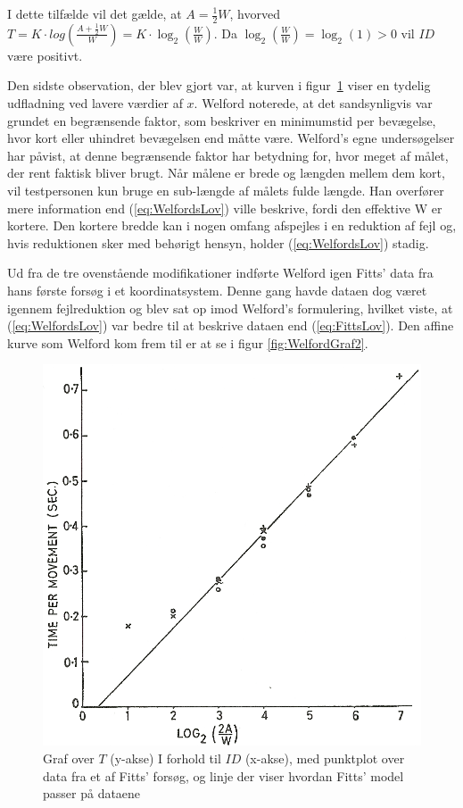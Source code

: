I dette tilfælde vil det gælde, at $A = \frac{1}{2}W$, hvorved $T = K \cdot log\left(\frac{A + \frac{1}{2}W}{W}\right) = K \cdot \log_2\left(\frac{W}{W}\right)$. Da $\log_2\left(\frac{W}{W}\right)=\log_2(1) > 0 $ vil $ID$ være positivt.

Den sidste observation, der blev gjort var, at kurven i figur~\ref{fig:WelfordGraf} viser en tydelig udfladning ved lavere værdier af $x$. Welford noterede, at det sandsynligvis var grundet en begrænsende faktor, som beskriver en minimumstid per bevægelse, hvor kort eller uhindret bevægelsen end måtte være. Welford's egne undersøgelser har påvist, at denne begrænsende faktor har betydning for, hvor meget af målet, der rent faktisk bliver brugt. Når målene er brede og længden mellem dem kort, vil testpersonen kun bruge en sub-længde af målets fulde længde. Han overfører mere information end (\ref{eq:WelfordsLov}) ville beskrive, fordi den effektive W er kortere. Den kortere bredde kan i nogen omfang afspejles i en reduktion af fejl og, hvis reduktionen sker med behørigt hensyn, holder (\ref{eq:WelfordsLov}) stadig.

Ud fra de tre ovenstående modifikationer indførte Welford igen Fitts' data fra hans første forsøg i et koordinatsystem. Denne gang havde dataen dog været igennem fejlreduktion og blev sat op imod Welford's formulering, hvilket viste, at (\ref{eq:WelfordsLov}) var bedre til at beskrive dataen end (\ref{eq:FittsLov}). Den affine kurve som Welford kom frem til er at se i figur \ref{fig:WelfordGraf2}.

\begin{figure}[h]
\centering
\includegraphics[width=.48\linewidth]{images/illustrations/welford_plot_1}
\caption{Graf over $T$ (y-akse) I forhold til $ID$ (x-akse), med punktplot over data fra et af Fitts' forsøg, og linje der viser hvordan Fitts' model passer på dataene}
\label{fig:WelfordGraf}
\end{figure}


